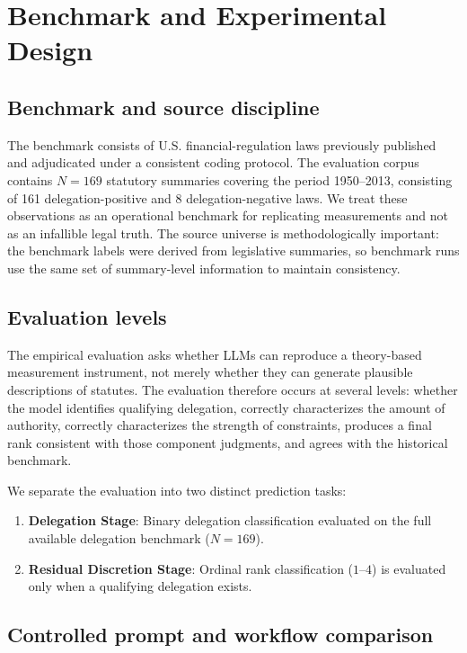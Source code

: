\documentclass[runningheads]{llncs}
\begin{document}
\section{Benchmark and Experimental Design}

\subsection{Benchmark and source discipline}

The benchmark consists of U.S. financial-regulation laws previously published and adjudicated under a consistent coding protocol. The evaluation corpus contains $N=169$ statutory summaries covering the period 1950--2013, consisting of 161 delegation-positive and 8 delegation-negative laws. We treat these observations as an operational benchmark for replicating measurements and not as an infallible legal truth. The source universe is methodologically important: the benchmark labels were derived from legislative summaries, so benchmark runs use the same set of summary-level information to maintain consistency.

\subsection{Evaluation levels}

The empirical evaluation asks whether LLMs can reproduce a theory-based measurement instrument, not merely whether they can generate plausible descriptions of statutes. The evaluation therefore occurs at several levels: whether the model identifies qualifying delegation, correctly characterizes the amount of authority, correctly characterizes the strength of constraints, produces a final rank consistent with those component judgments, and agrees with the historical benchmark.

We separate the evaluation into two distinct prediction tasks:
\begin{enumerate}
    \item \textbf{Delegation Stage}: Binary delegation classification evaluated on the full available delegation benchmark ($N=169$).
    \item \textbf{Residual Discretion Stage}: Ordinal rank classification ($1$--$4$) is evaluated only when a qualifying delegation exists.
\end{enumerate}


\subsection{Controlled prompt and workflow comparison}
\end{document}
